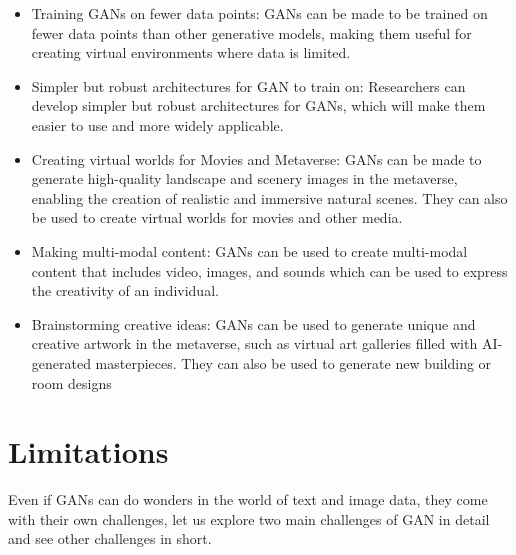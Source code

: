 \begin{itemize}
    \item Training GANs on fewer data points: GANs can be made to be trained on fewer data points than other generative models, making them useful for creating virtual environments where data is limited.
    \item Simpler but robust architectures for GAN to train on: Researchers can develop simpler but robust architectures for GANs, which will make them easier to use and more widely applicable.
    \item Creating virtual worlds for Movies and Metaverse: GANs can be made to generate high-quality landscape and scenery images in the metaverse, enabling the creation of realistic and immersive natural scenes. They can also be used to create virtual worlds for movies and other media.
    \item Making multi-modal content: GANs can be used to create multi-modal content that includes video, images, and sounds which can be used to express the creativity of an individual.
    \item Brainstorming creative ideas: GANs can be used to generate unique and creative artwork in the metaverse, such as virtual art galleries filled with AI-generated masterpieces. They can also be used to generate new building or room designs
\end{itemize}

\clearpage

\section{Limitations}

\noindent
Even if GANs can do wonders in the world of text and image data, they come with their own challenges, let us explore two main challenges of GAN in detail and see other challenges in short.


